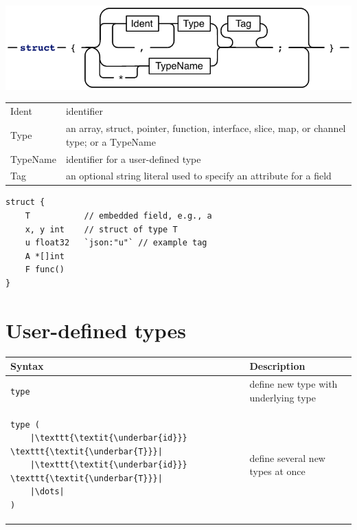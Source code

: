 \documentclass{article}
\newcommand{\var}[1]{\texttt{\textit{\underbar{#1}}}}
\begin{document}
\begin{multicols*}{3}
  \includegraphics[width=\linewidth]{struct}

  \begin{tabular}{p{0.45in}p{2.55in}}
  Ident &  identifier \\
  Type &  an array, struct, pointer, function, interface, slice, map, or channel type; or a TypeName \\
  TypeName &  identifier for a user-defined type \\
  Tag &  an optional string literal used to specify an attribute for a field \\
  \end{tabular}

  \vspace{\baselineskip}

\begin{lstlisting}[frame=single]
struct {
    T           // embedded field, e.g., a
    x, y int    // struct of type T
    u float32   `json:"u"` // example tag
    A *[]int
    F func()
}
\end{lstlisting}

  \filbreak
  \section*{User-defined types}

  \begin{tabular}{p{0.75in}p{2.25in}}
    \toprule
    \textbf{Syntax} & \textbf{Description} \\
    \midrule
    \lstinline!type!\texttt{ \var{id} \var{T}} & define new type \var{id} with underlying type \var{T} \\
    \midrule
    \begin{minipage}{0.7in}
\begin{lstlisting}[escapechar=|]
type (
    |\var{id} \var{T}|
    |\var{id} \var{T}|
    |\dots|
)
\end{lstlisting}
    \end{minipage}
                    & define several new types at once\\
    \bottomrule
  \end{tabular}


\end{multicols*}
\end{document}
